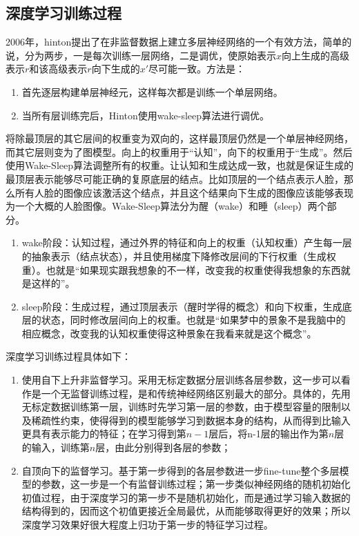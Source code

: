 \documentclass[UTF8]{ctexart}
\begin{document}
\subsection*{深度学习训练过程}
\par 2006年，hinton提出了在非监督数据上建立多层神经网络的一个有效方法，简单的说，分为两步，一是每次训练一层网络，二是调优，使原始表示$x$向上生成的高级表示$r$和该高级表示$r$向下生成的$x'$尽可能一致。方法是：
\begin{enumerate}[\indent 1)]
\item 首先逐层构建单层神经元，这样每次都是训练一个单层网络。

\item 当所有层训练完后，Hinton使用wake-sleep算法进行调优。
\end{enumerate}
\par 将除最顶层的其它层间的权重变为双向的，这样最顶层仍然是一个单层神经网络，而其它层则变为了图模型。向上的权重用于“认知”，向下的权重用于“生成”。然后使用Wake-Sleep算法调整所有的权重。让认知和生成达成一致，也就是保证生成的最顶层表示能够尽可能正确的复原底层的结点。比如顶层的一个结点表示人脸，那么所有人脸的图像应该激活这个结点，并且这个结果向下生成的图像应该能够表现为一个大概的人脸图像。Wake-Sleep算法分为醒（wake）和睡（sleep）两个部分。
\begin{enumerate}[\indent 1)]
\item wake阶段：认知过程，通过外界的特征和向上的权重（认知权重）产生每一层的抽象表示（结点状态），并且使用梯度下降修改层间的下行权重（生成权重）。也就是“如果现实跟我想象的不一样，改变我的权重使得我想象的东西就是这样的”。

\item sleep阶段：生成过程，通过顶层表示（醒时学得的概念）和向下权重，生成底层的状态，同时修改层间向上的权重。也就是“如果梦中的景象不是我脑中的相应概念，改变我的认知权重使得这种景象在我看来就是这个概念”。
\end{enumerate}
\par 深度学习训练过程具体如下：
\begin{enumerate}[\indent 1)]
\item 使用自下上升非监督学习。采用无标定数据分层训练各层参数，这一步可以看作是一个无监督训练过程，是和传统神经网络区别最大的部分。具体的，先用无标定数据训练第一层，训练时先学习第一层的参数，由于模型容量的限制以及稀疏性约束，使得得到的模型能够学习到数据本身的结构，从而得到比输入更具有表示能力的特征；在学习得到第$n-1$层后，将n-1层的输出作为第$n$层的输入，训练第$n$层，由此分别得到各层的参数；

\item 自顶向下的监督学习。基于第一步得到的各层参数进一步fine-tune整个多层模型的参数，这一步是一个有监督训练过程；第一步类似神经网络的随机初始化初值过程，由于深度学习的第一步不是随机初始化，而是通过学习输入数据的结构得到的，因而这个初值更接近全局最优，从而能够取得更好的效果；所以深度学习效果好很大程度上归功于第一步的特征学习过程。
\end{enumerate}
\end{document}
